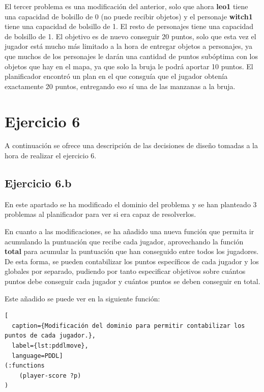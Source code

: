 \documentclass[11pt,a4paper]{article}
\begin{document}
El tercer problema es una modificación del anterior, solo que ahora \textbf{leo1} tiene una capacidad de bolsillo de 0 (no puede
recibir objetos) y el personaje \textbf{witch1} tiene una capacidad de bolsillo de 1. El resto de personajes tiene una capacidad
de bolsillo de 1. El objetivo es de nuevo conseguir 20 puntos, solo que esta vez el jugador está mucho más limitado a la hora de
entregar objetos a personajes, ya que muchos de los personajes le darán una cantidad de puntos subóptima con los objetos que hay
en el mapa, ya que solo la bruja le podrá aportar 10 puntos. El planificador encontró un plan en el que consguía que el jugador
obtenía exactamente 20 puntos, entregando eso sí una de las manzanas a la bruja.


\section{Ejercicio 6}

A continuación se ofrece una descripción de las decisiones de diseño tomadas a la hora de realizar el ejercicio 6.

\subsection{Ejercicio 6.b}

En este apartado se ha modificado el dominio del problema y se han planteado 3 problemas al planificador para ver si era capaz de
resolverlos.

En cuanto a las modificaciones, se ha añadido una nueva función que permita ir acumulando la puntuación que recibe
cada jugador, aprovechando la función \textbf{total} para acumular la puntuación que han conseguido entre todos los jugadores. De
esta forma, se pueden contabilizar los puntos específicos de cada jugador y los globales por separado, pudiendo por tanto especificar
objetivos sobre cuántos puntos debe conseguir cada jugador y cuántos puntos se deben conseguir en total.

Este añadido se puede ver en la siguiente función:

\begin{algorithm}[H]
\begin{lstlisting}[
  caption={Modificación del dominio para permitir contabilizar los puntos de cada jugador.},
  label={lst:pddlmove},
  language=PDDL]
(:functions
    (player-score ?p)
)
\end{lstlisting}
\end{algorithm}
\end{document}
